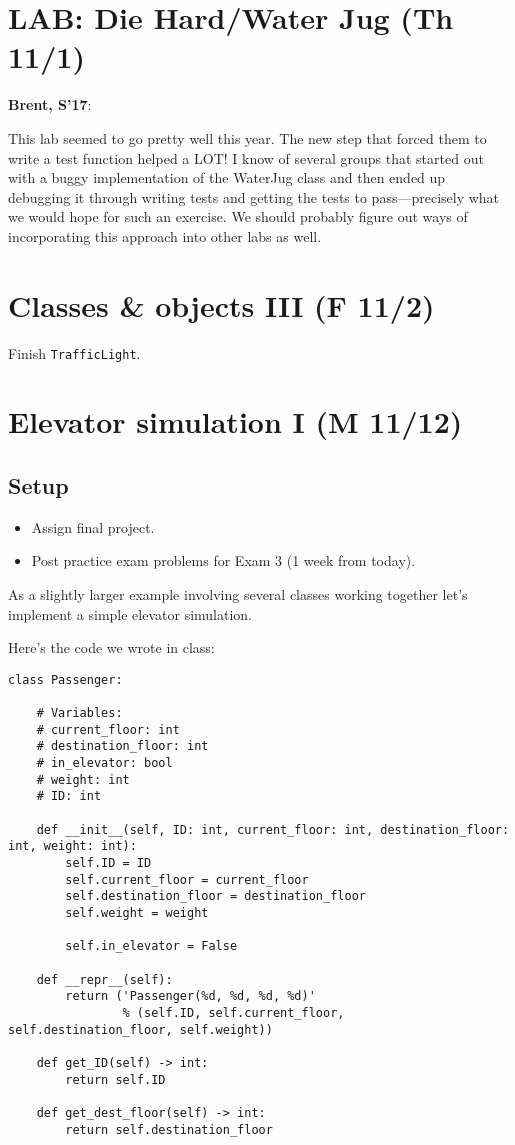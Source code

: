 \documentclass{article}
\newenvironment{reflect}[1]
{
  \noindent
  \begin{lrbox}{\reflectbox}
    \begin{minipage}[t]{\textwidth}
      \textbf{#1}:
}{
    \end{minipage}
  \end{lrbox}
  \fbox{\usebox{\reflectbox}}
}
\newcommand{\notready}{\textcolor{red}{\XSolidBold}\xspace}
\begin{document}
\newpage
\section*{\notready LAB: Die Hard/Water Jug (Th 11/1)}

\begin{reflect}{Brent, S'17}
  This lab seemed to go pretty well this year.  The new step that
  forced them to write a test function helped a LOT!  I know of
  several groups that started out with a buggy implementation of the
  WaterJug class and then ended up debugging it through writing tests
  and getting the tests to pass---precisely what we would hope for
  such an exercise.  We should probably figure out ways of
  incorporating this approach into other labs as well.
\end{reflect}

\newpage
\section{\notready Classes \& objects III (F 11/2)}

Finish \verb|TrafficLight|.

\newpage
\section{\notready Elevator simulation I (M 11/12)}

\subsection*{Setup}

\begin{itemize}
\item Assign final project.
\item Post practice exam problems for Exam 3 (1 week from today).
\end{itemize}

As a slightly larger example involving several classes working
together let's implement a simple elevator simulation.

Here's the code we wrote in class:

\begin{verbatim}
class Passenger:

    # Variables:
    # current_floor: int
    # destination_floor: int
    # in_elevator: bool
    # weight: int
    # ID: int

    def __init__(self, ID: int, current_floor: int, destination_floor: int, weight: int):
        self.ID = ID
        self.current_floor = current_floor
        self.destination_floor = destination_floor
        self.weight = weight

        self.in_elevator = False

    def __repr__(self):
        return ('Passenger(%d, %d, %d, %d)'
                % (self.ID, self.current_floor, self.destination_floor, self.weight))

    def get_ID(self) -> int:
        return self.ID

    def get_dest_floor(self) -> int:
        return self.destination_floor
\end{verbatim}
\end{document}
